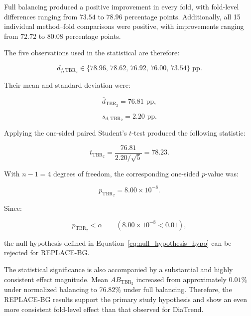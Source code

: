 Full balancing produced a positive improvement in every fold, with fold-level differences ranging from \(73.54\) to \(78.96\) percentage points. Additionally, all 15 individual method--fold comparisons were positive, with improvements ranging from \(72.72\) to \(80.08\) percentage points.

The five observations used in the statistical are therefore:

\begin{equation}
d_{f,\mathrm{TBR_2}}
\in
\{
78.96,\,
78.62,\,
76.92,\,
76.00,\,
73.54
\}
\text{ pp}.
\end{equation}

Their mean and standard deviation were:

\begin{equation}
\overline{d}_{\mathrm{TBR_2}}
=
76.81
\text{ pp},
\end{equation}

\begin{equation}
s_{d,\mathrm{TBR_2}}
=
2.20
\text{ pp}.
\end{equation}

Applying the one-sided paired Student's \(t\)-test produced the following statistic:

\begin{equation}
t_{\mathrm{TBR_2}}
=
\frac{76.81}{2.20/\sqrt{5}}
=
78.23.
\end{equation}

With \(n-1=4\) degrees of freedom, the corresponding one-sided \(p\)-value was:

\begin{equation}
p_{\mathrm{TBR_2}}
=
8.00 \times 10^{-8}.
\end{equation}

Since:

\begin{equation}
p_{\mathrm{TBR_2}} < \alpha
\qquad
(8.00 \times 10^{-8} < 0.01),
\end{equation}

the null hypothesis defined in Equation~\ref{eq:null_hypothesis_hypo} can be rejected for REPLACE-BG.

The statistical significance is also accompanied by a substantial and highly consistent effect magnitude. Mean \(AB_{\mathrm{TBR_2}}\) increased from approximately \(0.01\%\) under normalized balancing to \(76.82\%\) under full balancing. Therefore, the REPLACE-BG results support the primary study hypothesis and show an even more consistent fold-level effect than that observed for DiaTrend.

